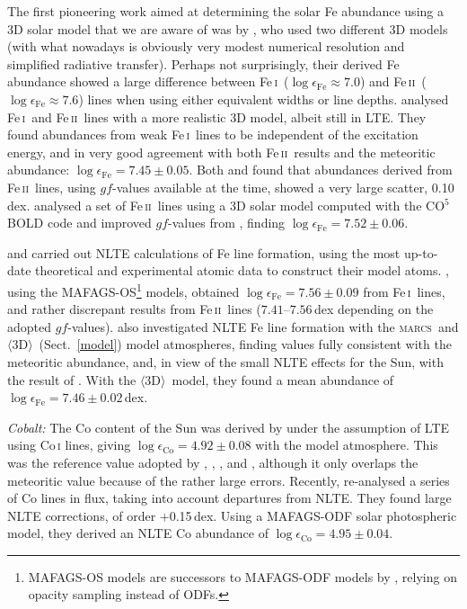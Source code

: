 \documentclass[traditabstract]{aa}
\newcommand{\oneDAV}{$\langle\mathrm{3D}\rangle$}
\newcommand{\marcs}{\textsc{marcs}}
\newcommand{\altfei}{Fe\,\textsc{i}}
\newcommand{\altfeii}{Fe\,\textsc{ii}}
\newcommand{\fei}{\altfei\ }
\newcommand{\feii}{\altfeii\ }
\begin{document}
The first pioneering work aimed at determining the solar Fe abundance using a 3D solar model that we are aware of was by \citet{1994A&A...291..635A}, who used two different 3D models (with what nowadays is obviously very modest numerical resolution and simplified radiative transfer). Perhaps not surprisingly, their derived Fe abundance showed a large difference between \fei ($\log \epsilon_\mathrm{Fe} \approx 7.0$) and \feii ($\log \epsilon_\mathrm{Fe} \approx 7.6$) lines when using either equivalent widths or line depths.
\citet{AspII} analysed \fei and \feii lines with a more realistic 3D model, albeit still in LTE. They found abundances from weak \fei lines to be
independent of the excitation energy, and in very good agreement with
both \feii results and the meteoritic abundance: $\log
\epsilon_\mathrm{Fe}=7.45\pm0.05$. Both \citet{GS99} and \citet{AspII} found that abundances derived from \feii lines, using $gf$-values available at the time, showed a very large scatter, 0.10\,dex.  \citet{Caffau11} analysed a set of \feii lines using a 3D solar model computed with the CO$^5$BOLD code \citet{COBOLD} and improved $gf$-values from
\cite{Melendez09}, finding $\log \epsilon_\mathrm{Fe}=7.52\pm0.06$.

\citet{2011A&A...528A..87M} and \citet{MB_fe} carried out NLTE calculations of Fe line formation, using the most up-to-date theoretical and experimental atomic data to construct their model atoms. \citet{2011A&A...528A..87M}, using the MAFAGS-OS\footnote{MAFAGS-OS models are successors to MAFAGS-ODF models by \citet{Fuhrmann97}, relying on opacity sampling instead of ODFs.} models, obtained $\log \epsilon_\mathrm{Fe}=7.56\pm0.09$ from \fei lines, and rather discrepant results from \feii lines ($7.41$--$7.56$\,dex depending on the adopted $gf$-values). \citet{MB_fe} also investigated NLTE Fe line formation with the \marcs\ and \oneDAV\ (Sect.~\ref{model}) model atmospheres, finding values fully consistent with the meteoritic abundance, and, in view of the small NLTE effects for the Sun, with the result of \citet{AspII}. With the \oneDAV\  model, they found a mean abundance of $\log \epsilon_\mathrm{Fe}=7.46\pm0.02$\,dex.

\textit{Cobalt:} The Co content of the Sun was derived by \citet{Cardon82} under the assumption of LTE using Co\,\textsc{i} lines, giving $\log \epsilon_\mathrm{Co}=4.92\pm0.08$ with the  model atmosphere. This was the reference value adopted by , , , \citet{Grevesse07} and \citet{Lodders09}, although it only overlaps the meteoritic value because of the rather large errors.  Recently, \citet{Bergemann10Co} re-analysed a series of Co lines
in flux, taking into account departures from NLTE.  They found large NLTE corrections, of order $+$0.15\,dex. Using a MAFAGS-ODF solar photospheric model, they derived an NLTE Co abundance of 
$\log \epsilon_\mathrm{Co}=4.95\pm0.04$.
\end{document}
